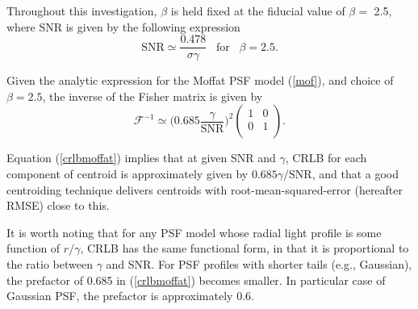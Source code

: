 \documentclass[12pt, preprint]{aastex}
\newcommand{\beq}{\begin{equation}}
\newcommand{\eeq}{\end{equation}}
\begin{document}
Throughout this investigation, $\beta$ is held fixed at the fiducial value of $\beta=$ 2.5, where SNR
is given by the following expression
\beq
\text{SNR} \simeq \frac{0.478}{\sigma \gamma}\;\;\; \mathrm{for}\;\;\; \beta = 2.5.
\eeq

Given the analytic expression for the Moffat PSF model (\ref{mof}), and choice of $\beta=2.5$, 
the inverse of the Fisher matrix is given by
\beq
  \mathcal{F}^{-1} \simeq \Big(0.685 \frac{\gamma}{\text{SNR}}\Big)^{2} 
  \begin{pmatrix}
      1 & 0\\
      0 & 1\\
  \end{pmatrix}.
\label{crlbmoffat}
\eeq

Equation (\ref{crlbmoffat}) implies that at given SNR and $\gamma$,
CRLB for each component of centroid is approximately given by $0.685\gamma/\text{SNR}$,
and that a good centroiding technique delivers centroids with
root-mean-squared-error (hereafter RMSE) close to this. 

It is worth noting that for any PSF model whose radial light profile is some function of 
$r/\gamma$, CRLB has the same functional form, in that it is proportional to the ratio
between $\gamma$ and SNR. 
For PSF profiles with shorter tails (e.g., Gaussian), the prefactor of 0.685 in (\ref{crlbmoffat})
becomes smaller. In particular case of Gaussian PSF, the prefactor is approximately 0.6. 
\end{document}
